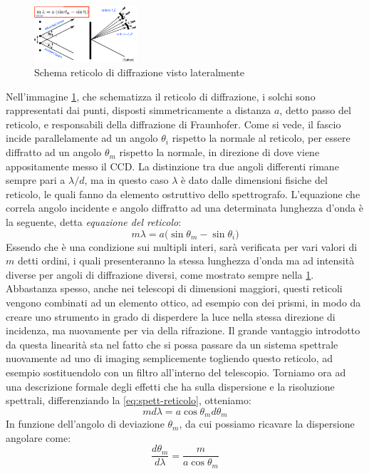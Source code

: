 \begin{figure}
    \centering
    \vspace{-5pt}
    \includegraphics[width=0.34\textwidth]{Immagini/Capitolo3/Reticolo_diffrazione.PNG}
    \caption{Schema reticolo di diffrazione visto lateralmente}
    \label{im:schema-diff-reticolo}
    \vspace{-5pt}
\end{figure}

Nell'immagine \ref{im:schema-diff-reticolo}, che schematizza il reticolo di diffrazione, i solchi sono rappresentati dai punti, disposti simmetricamente a distanza $a$, detto passo del reticolo, e responsabili della diffrazione di Fraunhofer. Come si vede, il fascio incide parallelamente ad un angolo $\theta_i$ rispetto la normale al reticolo, per essere diffratto ad un angolo $\theta_m$ rispetto la normale, in direzione di dove viene appositamente messo il CCD. La distinzione tra due angoli differenti rimane sempre pari a $\lambda/d$, ma in questo caso $\lambda$ è dato dalle dimensioni fisiche del reticolo, le quali fanno da elemento ostruttivo dello spettrografo. L'equazione che correla angolo incidente e angolo diffratto ad una determinata lunghezza d'onda è la seguente, detta \textit{equazione del reticolo}:
\begin{equation}
    \label{eq:spett-reticolo}
    m\lambda = a \bigl(\sin\theta_m-\sin\theta_i \bigr)
\end{equation}
Essendo che è una condizione sui multipli interi, sarà verificata per vari valori di $m$ detti ordini, i quali presenteranno la stessa lunghezza d'onda ma ad intensità diverse per angoli di diffrazione diversi, come mostrato sempre nella \ref{im:schema-diff-reticolo}. Abbastanza spesso, anche nei telescopi di dimensioni maggiori, questi reticoli vengono combinati ad un elemento ottico, ad esempio con dei prismi, in modo da creare uno strumento in grado di disperdere la luce nella stessa direzione di incidenza, ma nuovamente per via della rifrazione. Il grande vantaggio introdotto da questa linearità sta nel fatto che si possa passare da un sistema spettrale nuovamente ad uno di imaging semplicemente togliendo questo reticolo, ad esempio sostituendolo con un filtro all'interno del telescopio. Torniamo ora ad una descrizione formale degli effetti che ha sulla dispersione e la risoluzione spettrali, differenziando la \ref{eq:spett-reticolo}, otteniamo:
\begin{equation*}
    md\lambda = a\cos\theta_m d\theta_m
\end{equation*}
In funzione dell'angolo di deviazione $\theta_m$, da cui possiamo ricavare la dispersione angolare come:
\begin{equation*}
    \frac{d\theta_m}{d\lambda} = \frac{m}{a\cos\theta_m}
\end{equation*}

